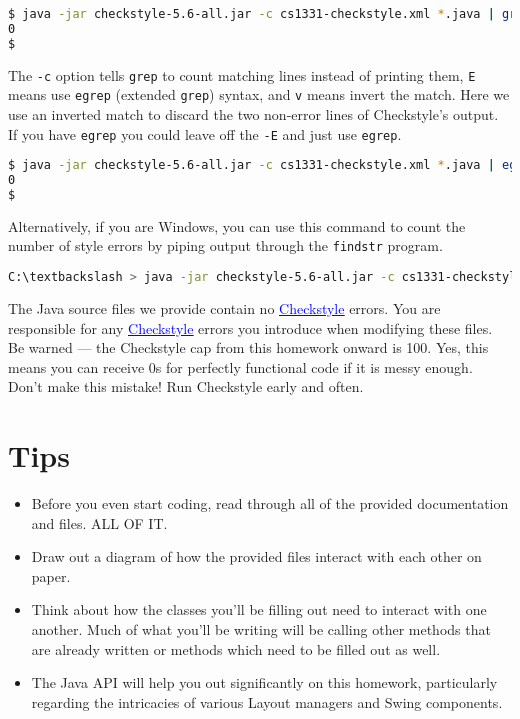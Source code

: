 \documentclass[12pt]{article}
\newcommand{\link}[2]{\href{#1}{\textcolor{blue}{\underline{#2}}} }
\begin{document}
\begin{lstlisting}[language=bash]
$ java -jar checkstyle-5.6-all.jar -c cs1331-checkstyle.xml *.java | grep -cEv "(Starting audit...|Audit done)"
0
$
\end{lstlisting}

The {\tt -c} option tells {\tt grep} to count matching lines instead of printing them, {\tt E} means use {\tt egrep} (extended {\tt grep}) syntax, and {\tt v} means invert the match.  Here we use an inverted match to discard the two non-error lines of Checkstyle's output.  If you have {\tt egrep} you could leave off the {\tt -E} and just use {\tt egrep}.

\begin{lstlisting}[language=bash]
$ java -jar checkstyle-5.6-all.jar -c cs1331-checkstyle.xml *.java | egrep -cv "(Starting audit...|Audit done)"
0
$
\end{lstlisting}

Alternatively, if you are Windows, you can use this command to count the number of style errors by piping output through the {\tt findstr} program.

\begin{lstlisting}[language=bash]
C:\textbackslash > java -jar checkstyle-5.6-all.jar -c cs1331-checkstyle.xml *.java |findstr /v "Starting audit..." | findstr /v "Audit done" | find /c /v "!!!!!"
\end{lstlisting}
The Java source files we provide contain no \link{http://checkstyle.sourceforge.net/}{Checkstyle} errors.  You are responsible for any \link{http://checkstyle.sourceforge.net/}{Checkstyle} errors you introduce when modifying these files.
Be warned --- the Checkstyle cap from this homework onward is 100. Yes, this means you can receive 0s for perfectly functional code if it is messy enough. Don't make this mistake! Run Checkstyle early and often.
\section{Tips}

\begin{itemize}
    \item Before you even start coding, read through all of the provided documentation and files. ALL OF IT.
    \item Draw out a diagram of how the provided files interact with each other on paper.
    \item Think about how the classes you'll be filling out need to interact with one another. Much of what you'll be writing will be calling other methods that are already written or methods which need to be filled out as well.
    \item The Java API will help you out significantly on this homework, particularly regarding the intricacies of various Layout managers and Swing components.
\end{itemize}
\end{document}
